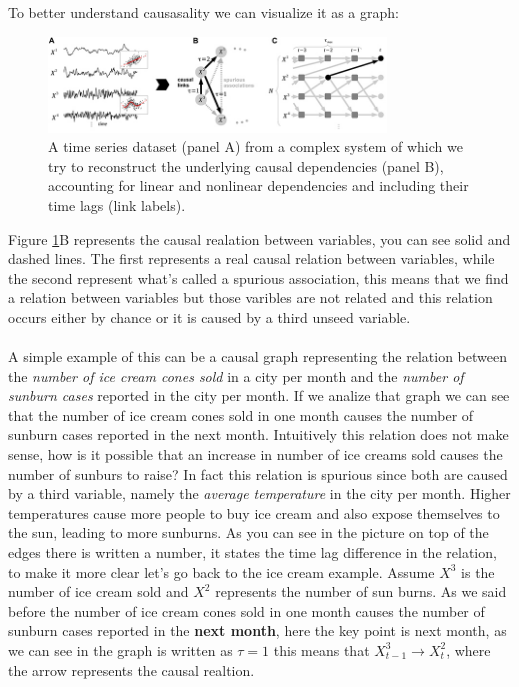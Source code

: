 To better understand causasality we can visualize it as a graph:
\begin{figure}[H] \label{fig:causalgraph}
    \centering
    \includegraphics[width=0.8\textwidth]{img/visualization.jpeg}
    \caption{A time series dataset (panel A) from a complex system of which we try to reconstruct the underlying causal dependencies (panel B), 
    accounting for linear and nonlinear dependencies and including their time lags (link labels). }
\end{figure}
Figure \ref{fig:causalgraph}B represents the causal realation between variables, you can see solid and dashed lines.
The first represents a real causal relation between variables, while the second represent what's called a spurious association, 
this means that we find a relation between variables but those varibles are not related and this relation occurs either by chance 
or it is caused by a third unseed variable.\\\\
A simple example of this can be a causal graph representing the relation between the \emph{number of ice cream cones sold} in a city
per month and the \emph{number of sunburn cases} reported in the city per month.
If we analize that graph we can see that the number of ice cream cones sold in one month causes the number of sunburn cases reported in the next month.
Intuitively this relation does not make sense, how is it possible that an increase in number of ice creams sold causes the number of sunburs to raise?
In fact this relation is spurious since both are caused by a third variable, namely the \emph{average temperature} in the city per month.
Higher temperatures cause more people to buy ice cream and also expose themselves to the sun, leading to more sunburns.
As you can see in the picture on top of the edges there is written a number, it states the time lag difference in the relation, to make it more clear 
let's go back to the ice cream example. Assume $X^3$ is the number of ice cream sold and $X^2$ represents the number of sun burns.
As we said before the number of ice cream cones sold in one month causes the number of sunburn cases reported in the \textbf{next month}, 
here the key point is next month, as we can see in the graph is written as $\tau=1$ this means that $X^3_{t-1}\rightarrow X^2_{t}$, where the arrow represents the causal realtion.

